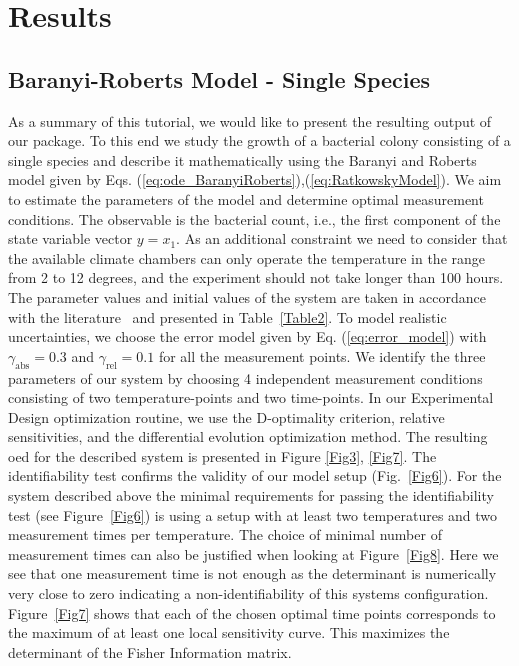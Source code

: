 \documentclass[graybox]{svmult}
\begin{document}
\section*{Results}
\subsection*{Baranyi-Roberts Model - Single Species}
As a summary of this tutorial, we would like to present the resulting output of our package.
To this end we study the growth of a bacterial colony consisting of a single species and describe it mathematically using the Baranyi and Roberts model given by Eqs. (\ref{eq:ode_BaranyiRoberts}),(\ref{eq:RatkowskyModel}).
We aim to estimate the parameters of the model and determine optimal measurement conditions.
The observable is the bacterial count, i.e., the first component of the state variable vector $y = x_1$.
As an additional constraint we need to consider that the available climate chambers can only operate the temperature in the range from 2 to 12 degrees, and the experiment should not take longer than 100 hours.
The parameter values and initial values of the system are taken in accordance with the literature~\cite{gospavic_mathematical_2008} and presented in Table~\ref{Table2}.
%
To model realistic uncertainties, we choose the error model given by Eq. (\ref{eq:error_model}) with $\gamma_\text{abs}=0.3$ and $\gamma_\text{rel}=0.1$ for all the measurement points.
We identify the three parameters of our system by choosing 4 independent measurement conditions consisting of two temperature-points and two time-points.
In our Experimental Design optimization routine, we use the D-optimality criterion, relative sensitivities, and the differential evolution optimization method.
The resulting \ac{oed} for the described system is presented in Figure \ref{Fig3}, \ref{Fig7}.
The identifiability test confirms the validity of our model setup (Fig.~\ref{Fig6}).
%
%
For the system described above the minimal requirements for passing the identifiability test (see Figure~\ref{Fig6}) is using a setup with at least two temperatures and two measurement times per temperature.
The choice of minimal number of measurement times can also be justified when looking at Figure~\ref{Fig8}.
Here we see that one measurement time is not enough as the determinant is numerically very close to zero indicating a non-identifiability of this systems configuration.
%
%
Figure~\ref{Fig7} shows that each of the chosen optimal time points corresponds to the maximum of at least one local sensitivity curve.
This maximizes the determinant of the Fisher Information matrix.
%
%
%
\end{document}
